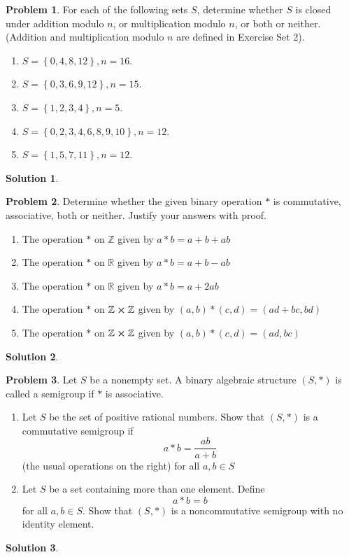 \documentclass[10pt]{article}
\theoremstyle{definition}
\newtheorem{problem}{Problem}
\newtheorem{soln}{Solution}
\begin{document}
\begin{problem}
For each of the following sets $S$, determine whether $S$ is closed under
addition modulo $n$, or multiplication modulo $n$, or both or neither.
(Addition and multiplication modulo $n$ are defined in Exercise Set 2).
\begin{enumerate}[label=(\alph*)]
  \item $S=\left\{0,4,8,12\right\},n=16$.
  \item $S=\left\{0,3,6,9,12\right\},n=15$.
  \item $S=\left\{1,2,3,4\right\},n=5$.
  \item $S=\left\{0,2,3,4,6,8,9,10\right\},n=12$.
  \item $S=\left\{1,5,7,11\right\},n=12$.
\end{enumerate}
\end{problem}
\begin{soln}
\end{soln}

\begin{problem}
Determine whether the given binary operation $*$ is commutative,
associative, both or neither. Justify your answers with proof.
\begin{enumerate}[label=(\alph*)]
  \item The operation $*$ on $\mathbb{Z}$ given by $a*b=a+b+ab$
  \item The operation $*$ on $\mathbb{R}$ given by $a*b=a+b-ab$
  \item The operation $*$ on $\mathbb{R}$ given by $a*b=a+2ab$
  \item The operation $*$ on $\mathbb{Z}\cross\mathbb{Z}$ given by $(a,b)*(c,d)=(ad+bc, bd)$
  \item The operation $*$ on $\mathbb{Z}\cross\mathbb{Z}$ given by $(a,b)*(c,d)=(ad,bc)$
\end{enumerate}
\end{problem}
\begin{soln}
\end{soln}

\begin{problem}
Let $S$ be a nonempty set. A binary algebraic structure $(S, *)$ is called
a semigroup if $*$ is associative.
\begin{enumerate}[label=(\alph*)]
  \item Let $S$ be the set of positive rational numbers. Show that $(S, *)$
        is a commutative semigroup if
        $$a*b=\frac{ab}{a+b}$$
        (the usual operations on the right) for all $a,b\in S$
  \item Let $S$ be a set containing more than one element. Define
        $$a*b=b$$
        for all $a,b\in S$. Show that $(S,*)$ is a noncommutative semigroup with no identity element.
\end{enumerate}
\end{problem}
\begin{soln}
\end{soln}
\end{document}
